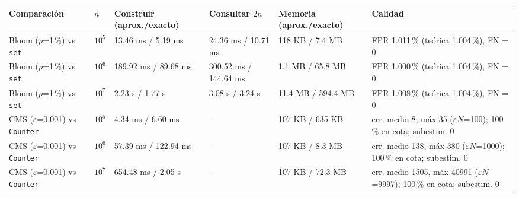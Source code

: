 \setlength{\tabcolsep}{4pt}
\begin{tabular}{@{}llllll@{}}\toprule
Comparación & $n$ & Construir (aprox./exacto) & Consultar $2n$ & Memoria (aprox./exacto) & Calidad \\\midrule
Bloom ($p$=1\,\%) vs \texttt{set} & $10^5$ & 13.46 ms / 5.19 ms & 24.36 ms / 10.71 ms & 118 KB / 7.4 MB & FPR 1.011\,\% (teórica 1.004\,\%), FN = 0 \\
Bloom ($p$=1\,\%) vs \texttt{set} & $10^6$ & 189.92 ms / 89.68 ms & 300.52 ms / 144.64 ms & 1.1 MB / 65.8 MB & FPR 1.000\,\% (teórica 1.004\,\%), FN = 0 \\
Bloom ($p$=1\,\%) vs \texttt{set} & $10^7$ & 2.23 s / 1.77 s & 3.08 s / 3.24 s & 11.4 MB / 594.4 MB & FPR 1.008\,\% (teórica 1.004\,\%), FN = 0 \\
CMS ($\varepsilon$=0.001) vs \texttt{Counter} & $10^5$ & 4.34 ms / 6.60 ms & -- & 107 KB / 635 KB & err. medio 8, máx 35 ($\varepsilon N$=100); 100\,\% en cota; subestim. 0 \\
CMS ($\varepsilon$=0.001) vs \texttt{Counter} & $10^6$ & 57.39 ms / 122.94 ms & -- & 107 KB / 8.3 MB & err. medio 138, máx 380 ($\varepsilon N$=1000); 100\,\% en cota; subestim. 0 \\
CMS ($\varepsilon$=0.001) vs \texttt{Counter} & $10^7$ & 654.48 ms / 2.05 s & -- & 107 KB / 72.3 MB & err. medio 1505, máx 40991 ($\varepsilon N$=9997); 100\,\% en cota; subestim. 0 \\
\bottomrule\end{tabular}